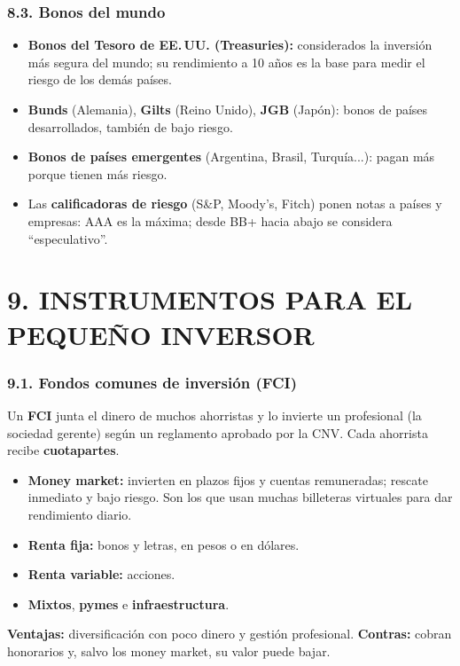 \subsubsection*{8.3. Bonos del mundo}
\begin{itemize}
  \item \textbf{Bonos del Tesoro de EE.\,UU. (Treasuries):} considerados la inversión más segura
        del mundo; su rendimiento a 10 años es la base para medir el riesgo de los demás países.
  \item \textbf{Bunds} (Alemania), \textbf{Gilts} (Reino Unido), \textbf{JGB} (Japón): bonos de
        países desarrollados, también de bajo riesgo.
  \item \textbf{Bonos de países emergentes} (Argentina, Brasil, Turquía...): pagan más porque
        tienen más riesgo.
  \item Las \textbf{calificadoras de riesgo} (S\&P, Moody's, Fitch) ponen notas a países y
        empresas: AAA es la máxima; desde BB+ hacia abajo se considera ``especulativo''.
\end{itemize}

\section*{9. INSTRUMENTOS PARA EL PEQUEÑO INVERSOR}

\subsubsection*{9.1. Fondos comunes de inversión (FCI)}
Un \textbf{FCI} junta el dinero de muchos ahorristas y lo invierte un profesional (la sociedad
gerente) según un reglamento aprobado por la CNV. Cada ahorrista recibe
\textbf{cuotapartes}.
\begin{itemize}
  \item \textbf{Money market:} invierten en plazos fijos y cuentas remuneradas; rescate
        inmediato y bajo riesgo. Son los que usan muchas billeteras virtuales para dar
        rendimiento diario.
  \item \textbf{Renta fija:} bonos y letras, en pesos o en dólares.
  \item \textbf{Renta variable:} acciones.
  \item \textbf{Mixtos}, \textbf{pymes} e \textbf{infraestructura}.
\end{itemize}
\textbf{Ventajas:} diversificación con poco dinero y gestión profesional.
\textbf{Contras:} cobran honorarios y, salvo los money market, su valor puede bajar.

